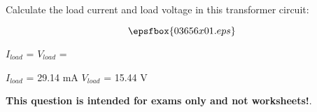 

Calculate the load current and load voltage in this transformer circuit:

$$\epsfbox{03656x01.eps}$$

$I_{load}$ = \hskip 80pt $V_{load}$ =

\vskip 10pt







$I_{load}$ = 29.14 mA \hskip 80pt $V_{load}$ = 15.44 V







{\bf This question is intended for exams only and not worksheets!}.



